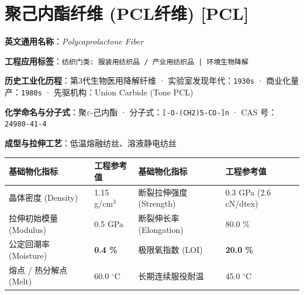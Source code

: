 \documentclass[11pt,openright,twoside,UTF8]{ctexbook}
\begin{document}
\section{聚己内酯纤维 (PCL纤维) [PCL]}
\label{sec:pcl}

\noindent\textbf{英文通用名称}：\textit{Polycaprolactone Fiber}\par
\noindent\textbf{工程应用标签}：\texttt{纺织门类: 服装用纺织品 / 产业用纺织品 | 环境生物降解}\par
\noindent\textbf{历史工业化历程}：第3代生物医用降解纤维 · 实验室发现年代：\texttt{1930s} · 商业化量产：\texttt{1980s} · 先驱机构：Union Carbide (Tone PCL)\par
\noindent\textbf{化学命名与分子式}：聚$\varepsilon$-己内酯 · 分子式：\texttt{[-O-(CH2)5-CO-]n} · CAS 号：\texttt{24980-41-4}\par
\noindent\textbf{成型与拉伸工艺}：低温熔融纺丝、溶液静电纺丝\par

\vspace{0.15cm}
\begin{center}
\small
\begin{tabularx}{\textwidth}{p{3.8cm}Xp{3.8cm}X}
\toprule
\textbf{基础物化指标} & \textbf{工程参考值} & \textbf{基础物化指标} & \textbf{工程参考值} \\
\midrule
晶体密度 (Density) & 1.15 g/cm$^3$ & 断裂拉伸强度 (Strength) & 0.3 GPa (2.6 cN/dtex) \\
拉伸初始模量 (Modulus) & 0.5 GPa & 断裂伸长率 (Elongation) & 80.0 \% \\
公定回潮率 (Moisture) & \textbf{0.4 \%} & 极限氧指数 (LOI) & \textbf{20.0 \%} \\
熔点 / 热分解点 (Melt) & 60.0 $^\circ\mathrm{C}$ & 长期连续服役耐温 & 45.0 $^\circ\mathrm{C}$ \\
\bottomrule
\end{tabularx}
\end{center}
\vspace{0.15cm}
\end{document}
